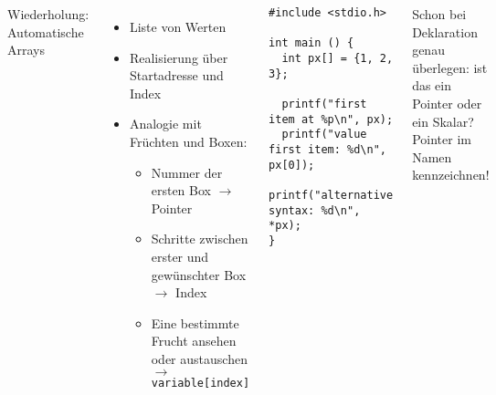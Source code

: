 \begin{frame}[fragile]
%
\begin{columns}[T]
\begin{Large}
{Wiederholung: Automatische Arrays}
\vspace{6pt}
\end{Large}
%
\begin{itemize}
\item Liste von Werten
\item Realisierung über Startadresse und Index
\item Analogie mit Früchten und Boxen:
	\begin{itemize}
	\item Nummer der ersten Box \newline 
		$\rightarrow$ Pointer
	\item Schritte zwischen erster und gewünschter Box \newline
		$\rightarrow$ Index
	\item Eine bestimmte Frucht ansehen oder austauschen \newline
		$\rightarrow$ \texttt{variable[index]}
	\end{itemize}
\end{itemize}
%
\begin{codebox}
\begin{verbatim}
#include <stdio.h>

int main () {
  int px[] = {1, 2, 3};

  printf("first item at %p\n", px);
  printf("value first item: %d\n", px[0]);
  printf("alternative syntax: %d\n", *px);
}
\end{verbatim}
\end{codebox}
%
\begin{hintbox}
Schon bei Deklaration genau überlegen: ist das ein Pointer oder ein Skalar?\newline
Pointer im Namen kennzeichnen!
\end{hintbox}
\end{columns}

%
\end{frame}



